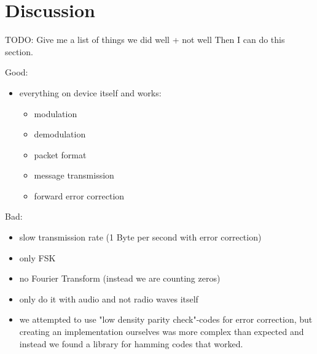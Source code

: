 \chapter{Discussion}

TODO: Give me a list of things we did well + not well
Then I can do this section.

Good:
\begin{itemize}
    \item everything on device itself and works:
    \begin{itemize}
        \item modulation
        \item demodulation
        \item packet format
        \item message transmission
        \item forward error correction
    \end{itemize}
\end{itemize}

Bad:
\begin{itemize}
    \item slow transmission rate (1 Byte per second with error correction)
    \item only FSK
    \item no Fourier Transform (instead we are counting zeros)
    \item only do it with audio and not radio waves itself
    \item we attempted to use "low density parity check"-codes for error correction, but creating an implementation ourselves was more complex than expected and instead we found a library for hamming codes that worked.
\end{itemize}


